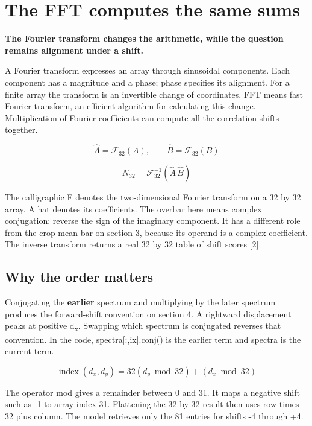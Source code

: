 \documentclass[11pt,letterpaper]{article}
\begin{document}
\clearpage

\section{The FFT computes the same sums}\label{sec6}

\textbf{The Fourier transform changes the arithmetic, while the question remains alignment under a shift.}


A Fourier transform expresses an array through sinusoidal components. Each component has a magnitude and a phase; phase specifies its alignment. For a finite array the transform is an invertible change of coordinates. FFT means fast Fourier transform, an efficient algorithm for calculating this change. Multiplication of Fourier coefficients can compute all the correlation shifts together.


\begin{equation}\widehat A=\mathcal F_{32}(A),\qquad \widehat B=\mathcal F_{32}(B)\end{equation}

\begin{equation}N_{32}=\mathcal F_{32}^{-1}(\overline{\widehat A}\,\widehat B)\end{equation}

The calligraphic F denotes the two-dimensional Fourier transform on a 32 by 32 array. A hat denotes its coefficients. The overbar here means complex conjugation: reverse the sign of the imaginary component. It has a different role from the crop-mean bar on section 3, because its operand is a complex coefficient. The inverse transform returns a real 32 by 32 table of shift scores [2].


\subsection*{Why the order matters}

Conjugating the \textbf{earlier} spectrum and multiplying by the later spectrum produces the forward-shift convention on section 4. A rightward displacement peaks at positive d\textsubscript{x}. Swapping which spectrum is conjugated reverses that convention. In the code, spectra[:,ix].conj() is the earlier term and spectra is the current term.


\begin{equation}\operatorname{index}(d_x,d_y)=32(d_y\bmod32)+(d_x\bmod32)\end{equation}

The operator mod gives a remainder between 0 and 31. It maps a negative shift such as -1 to array index 31. Flattening the 32 by 32 result then uses row times 32 plus column. The model retrieves only the 81 entries for shifts -4 through +4.
\end{document}
